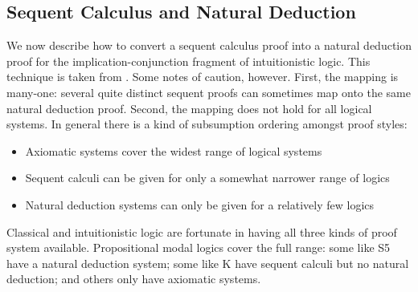 \subsection{Sequent Calculus and Natural Deduction}
We now describe how to convert a sequent calculus proof into a natural
deduction proof for the implication-conjunction fragment of
 intuitionistic logic.
This technique is taken from .  Some notes of
caution, however.  First, the mapping is many-one: several quite
distinct sequent proofs can sometimes map onto the same natural 
deduction proof.  Second, the mapping does not hold for all logical
systems. In general there is a kind of subsumption ordering amongst
proof styles:
\begin{itemize}
\item Axiomatic systems cover the widest range of logical systems
\item Sequent calculi can be given for only a somewhat narrower range
of logics
\item Natural deduction systems can only be given for a relatively few
logics
\end{itemize}
Classical and intuitionistic logic are fortunate in having all three
kinds of proof system available. Propositional modal logics cover the
full range: some like S5 have a natural deduction system; some like K
have sequent calculi but no natural deduction; and others only have
axiomatic systems.

